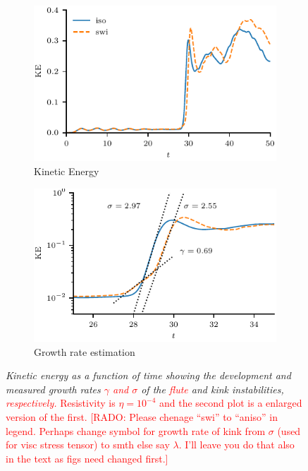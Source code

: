\documentclass[12pt]{article}
\newcommand{\rs}[2]{\textcolor{red}{#2}}
\newcommand{\mycaption}[2]{\caption[#1]{\emph{#1} #2}}
\begin{document}
\begin{figure}[t]
  \centering
    \begin{subfigure}{0.49\textwidth}
      \includegraphics[width=\linewidth]{kinetic_energy-4.pdf}
      \caption{Kinetic Energy}
      \label{fig:kink_ke-4}
    \end{subfigure}
    \hfill
    \begin{subfigure}{0.49\textwidth}
      \includegraphics[width=\linewidth]{kinetic_energy_log-4.pdf}
      \caption{Growth rate estimation}
      \label{fig:kink_ke_log-4}
    \end{subfigure}
  \mycaption{Kinetic energy as a function of time showing the
    development and measured growth rates \rs{}{$\gamma$ and $\sigma$}
    of the \rs{fluting}{flute}
    and kink instabilities, \rs{}{respectively.}}{\rs{Both plots are from results
      where}{Resistivity is $\eta=10^{-4}$ and the second plot is a
      enlarged version of the first. [RADO: Please chenage ``swi'' to
      ``aniso'' in legend.  Perhaps change symbol for growth rate of
        kink from $\sigma$ (used for visc stress tensor) to smth else
        say $\lambda$. I'll leave you do that also in the text as figs
  need changed first.]}}
\label{fig:kink_str8_ke-4}%
\end{figure}
\end{document}
